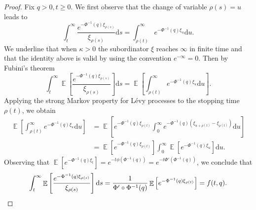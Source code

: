 \documentclass[10pt]{amsart}
\theoremstyle{definition}
\numberwithin{equation}{section}
\DeclareMathOperator{\E}{\mathbb{E}}
\newcommand{\dd}{\mathrm{d}}
\begin{document}
\begin{proof}
Fix $q>0, t \geq 0$.
We first observe that the change of variable $\rho(s) = u$ leads to
\[
\int_t^\infty \frac{e^{-\Phi^{-1}(q) \xi_{\rho(s)}}}{\xi_{\rho(s)}} \dd s = \int_{\rho(t)}^{\infty} e^{-\Phi^{-1}(q) \xi_u} \dd u.
\]
We underline that when $\kappa > 0$ the subordinator $\xi$ reaches $\infty$ in finite time and that the identity above is valid by using the convention $e^{-\infty} = 0$. Then by Fubini's theorem
\[
\int_t^\infty \E\left[\frac{e^{-\Phi^{-1}(q)\xi_{\rho(s)}}}{\xi_{\rho(s)}} \right] \dd s =
\E\left[\int_{\rho(t)}^{\infty} e^{-\Phi^{-1}(q) \xi_u} \dd u \right].
\]
Applying the strong Markov property for Lévy processes to the stopping time $\rho(t)$, we obtain
\begin{align*}
\E\left[\int_{\rho(t)}^{\infty} e^{-\Phi^{-1}(q) \xi_u} \dd u \right] &= \E\left[e^{-\Phi^{-1}(q) \xi_{\rho(t)}} \int_0^{\infty} e^{-\Phi^{-1}(q) \left(\xi_{u +\rho(t)} - \xi_{\rho(t)}\right)} \dd u \right]\\
&= \E\left[e^{-\Phi^{-1}(q) \xi_{\rho(t)}} \right] \int_0^\infty \E\left[e^{-\Phi^{-1}(q) \xi_{u}} \right] \dd u.
\end{align*}
Observing that $\E[e^{- \Phi^{-1}(q) \xi_t}] = e^{-t \phi(\Phi^{-1}(q))}=e^{-t \Phi'(\Phi^{-1}(q))}$, we conclude that
\[
\int_t^\infty \E\left[\frac{e^{-\Phi^{-1}(q)\xi_{\rho(s)}}}{\xi_{\rho(s)}} \right] \dd s = \frac{1}{\Phi' \circ \Phi^{-1}(q)}\E\left[e^{-\Phi^{-1}(q) \xi_{\rho(t)}} \right] = f(t,q). \qedhere
\]
\end{proof}
\end{document}
